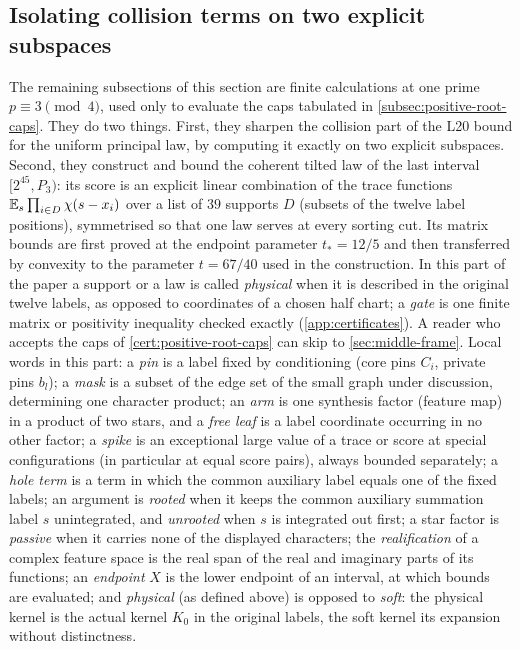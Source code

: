 \subsection{Isolating collision terms on two explicit subspaces}
\label{imp:local:protected-section}

The remaining subsections of this section are finite calculations
at one prime $p\equiv3\pmod4$, used only to evaluate the caps
tabulated in \cref{subsec:positive-root-caps}. They do two things.
First, they sharpen the collision part of the L20 bound for the
uniform principal law, by computing it exactly on two explicit
subspaces. Second, they construct and bound the coherent tilted
law of the last interval $[2^{45},P_3)$: its score is an explicit
linear combination of the trace functions
$\mathbb E_s\prod_{i\in D}\chi(s-x_i)$ over a list of $39$ supports
$D$ (subsets of the twelve label positions), symmetrised so that
one law serves at every sorting cut. Its matrix bounds are first
proved at the endpoint parameter $t_*=12/5$ and then transferred
by convexity to the parameter $t=67/40$ used in the construction.
In this part of the paper a support or a law is called
\emph{physical} when it is described in the original twelve
labels, as opposed to coordinates of a chosen half chart; a
\emph{gate} is one finite matrix or positivity inequality checked
exactly (\cref{app:certificates}). A reader who accepts the caps of
\cref{cert:positive-root-caps} can skip to
\cref{sec:middle-frame}. Local words in this part: a \emph{pin}
is a label fixed by conditioning (core pins $C_i$, private pins
$b_l$); a \emph{mask} is a subset of the edge set of the small
graph under discussion, determining one character product; an
\emph{arm} is one synthesis factor (feature map) in a product of
two stars, and a \emph{free leaf} is a label coordinate occurring
in no other factor; a \emph{spike} is an exceptional large value
of a trace or score at special configurations (in particular at
equal score pairs), always bounded separately; a \emph{hole
term} is a term in which the common auxiliary label equals one of
the fixed labels; an argument is \emph{rooted} when it keeps the
common auxiliary summation label $s$ unintegrated, and
\emph{unrooted} when $s$ is integrated out first; a star factor
is \emph{passive} when it carries none of the displayed
characters; the \emph{realification} of a complex feature space
is the real span of the real and imaginary parts of its
functions; an \emph{endpoint} $X$ is the lower endpoint of an
interval, at which bounds are evaluated; and \emph{physical}
(as defined above) is opposed to \emph{soft}: the physical
kernel is the actual kernel $K_0$ in the original labels, the
soft kernel its expansion without distinctness.

